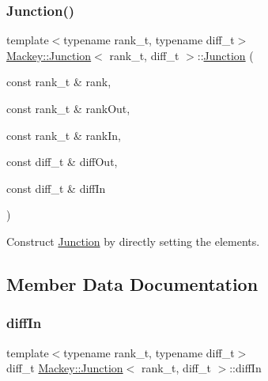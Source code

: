 \subsubsection{\texorpdfstring{Junction()}{Junction()}\hspace{0.1cm}{\footnotesize\ttfamily [3/3]}}
{\footnotesize\ttfamily template$<$typename rank\+\_\+t, typename diff\+\_\+t$>$ \\
\hyperlink{classMackey_1_1Junction}{Mackey\+::\+Junction}$<$ rank\+\_\+t, diff\+\_\+t $>$\+::\hyperlink{classMackey_1_1Junction}{Junction} (\begin{DoxyParamCaption}\item[{const rank\+\_\+t \&}]{rank,  }\item[{const rank\+\_\+t \&}]{rank\+Out,  }\item[{const rank\+\_\+t \&}]{rank\+In,  }\item[{const diff\+\_\+t \&}]{diff\+Out,  }\item[{const diff\+\_\+t \&}]{diff\+In }\end{DoxyParamCaption})\hspace{0.3cm}{\ttfamily [inline]}}



Construct \hyperlink{classMackey_1_1Junction}{Junction} by directly setting the elements. 



\subsection{Member Data Documentation}
\mbox{\label{classMackey_1_1Junction_a581e0d7b62b7bf380d68936a79828cfc}} 
\subsubsection{\texorpdfstring{diff\+In}{diffIn}}
{\footnotesize\ttfamily template$<$typename rank\+\_\+t, typename diff\+\_\+t$>$ \\
diff\+\_\+t \hyperlink{classMackey_1_1Junction}{Mackey\+::\+Junction}$<$ rank\+\_\+t, diff\+\_\+t $>$\+::diff\+In}

\mbox{\label{classMackey_1_1Junction_a909fce095bc4647a312d6b10480b2d9a}} 
